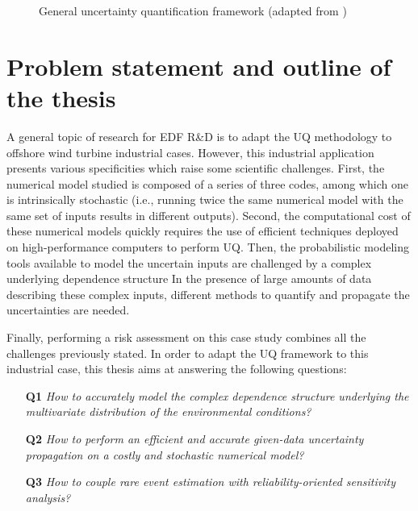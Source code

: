 \begin{figure}[!h]
    \centering
    
    \caption{General uncertainty quantification framework (adapted from \cite{ajenjo_2023})}
    \label{fig:UQ_methodo}
\end{figure}


\section*{Problem statement and outline of the thesis}
A general topic of research for EDF R\&D is to adapt the UQ methodology to offshore wind turbine industrial cases.  
However, this industrial application presents various specificities which raise some scientific challenges. 
First, the numerical model studied is composed of a series of three codes, among which one is intrinsically stochastic 
(i.e., running twice the same numerical model with the same set of inputs results in different outputs). 
Second, the computational cost of these numerical models quickly requires the use of efficient techniques deployed on high-performance computers to perform UQ.
Then, the probabilistic modeling tools available to model the uncertain inputs are challenged by a complex underlying dependence structure
In the presence of large amounts of data describing these complex inputs, different methods to quantify and propagate the uncertainties are needed.  

Finally, performing a risk assessment on this case study combines all the challenges previously stated. 
In order to adapt the UQ framework to this industrial case, this thesis aims at answering the following questions:
\begin{itemize}
    \item[\textbf{Q1}] \textit{How to accurately model the complex dependence structure underlying the multivariate distribution of the environmental conditions?} 
    \item[\textbf{Q2}] \textit{How to perform an efficient and accurate given-data uncertainty propagation on a costly and stochastic numerical model?}
    \item[\textbf{Q3}] \textit{How to couple rare event estimation with reliability-oriented sensitivity analysis?}
\end{itemize}


